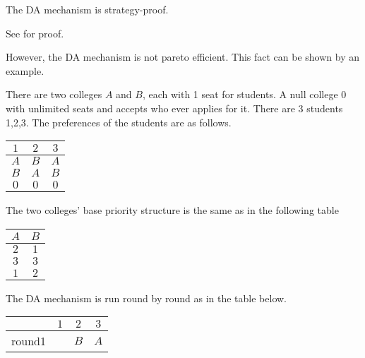 \begin{thm}
\label{thm1}
The DA mechanism is strategy-proof.
\end{thm}

See \parencite{Roth1982a} for proof.

However, the DA mechanism is not pareto efficient.  This fact can be shown by an example.

\begin{example}
There are two colleges $A$ and $B$, each with 1 seat for students. A null college $0$ with unlimited seats and accepts who ever applies for it. There are
3 students 1,2,3. The preferences of the students are
as follows.

    \begin{center}
      \begin{tabular}{|c|c|c|}
        \hline
        $1$ & $2$ & $3$ \\
        \hline
        $A$ & $B$ & $A$ \\
        
        $B$ & $A$ & $B$ \\

        $0$ & $0$ & $0$ \\

        \hline
        
      \end{tabular}
    \end{center}

The two colleges' base priority structure is the same as in the following
table

 \begin{center}
      \begin{tabular}{|c|c|}
        \hline
         $A$ & $B$ \\
        \hline
        $2$ & $1$\\
        
        $3$ & $3$ \\

        $1$ & $2$ \\
       
        \hline
        
      \end{tabular}
    \end{center}
 
The DA mechanism is run round by round as in the table below.

 \begin{center}
      \begin{tabular}{|c|c|c|c|}
        \hline
        &$1$ & $2$ & $3$\\
        \hline
       round1&   & $B$ & $A$ \\
        

\end{tabular}
\end{center}
\end{example}
